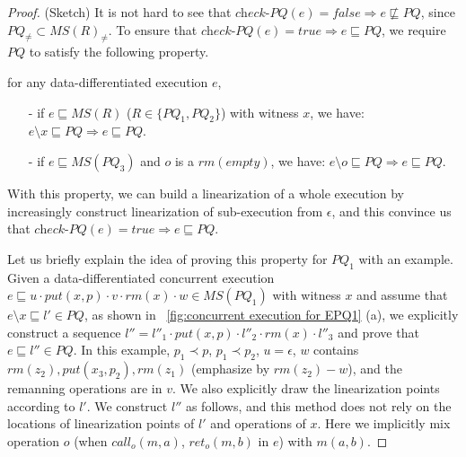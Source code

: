 \begin {proof} (Sketch)
It is not hard to see that $\textit{check-PQ}(e) = \textit{false} \Rightarrow e \not\sqsubseteq \textit{PQ}$, since $\textit{PQ}_{\neq} \subset \textit{MS}(R)_{\neq}$. To ensure that $\textit{check-PQ}(e) = \textit{true} \Rightarrow e \sqsubseteq \textit{PQ}$, we require $\textit{PQ}$ to satisfy the following property.  

for any data-differentiated execution $e$,
\begin{itemize}
\setlength{\itemsep}{0.5pt}
\item[-] if $e \sqsubseteq \textit{MS}(R)$ ($R \in \{ \textit{PQ}_1, \textit{PQ}_2 \}$) with witness $x$, we have: $e \setminus x \sqsubseteq \textit{PQ} \Rightarrow e \sqsubseteq \textit{PQ}$.

\item[-] if $e \sqsubseteq \textit{MS}(\textit{PQ}_3)$ and $o$ is a $\textit{rm}(\textit{empty})$, we have: $e \setminus o \sqsubseteq \textit{PQ} \Rightarrow e \sqsubseteq \textit{PQ}$.
\end{itemize}

With this property, we can build a linearization of a whole execution by increasingly construct linearization of sub-execution from $\epsilon$, and this convince us that $\textit{check-PQ}(e) = \textit{true} \Rightarrow e \sqsubseteq \textit{PQ}$. 

Let us briefly explain the idea of proving this property for $\textit{PQ}_1$ with an example. Given a data-differentiated concurrent execution $e \sqsubseteq u \cdot \textit{put}(x,p) \cdot v \cdot \textit{rm}(x) \cdot w \in \textit{MS}(\textit{PQ}_1)$ with witness $x$ and assume that $e \setminus x \sqsubseteq l' \in \textit{PQ}$, as shown in \figurename~\ref{fig:concurrent execution for EPQ1} (a), we explicitly construct a sequence $l''= l''_1 \cdot \textit{put}(x,p) \cdot l''_2 \cdot \textit{rm}(x) \cdot l''_3$ and prove that $e \sqsubseteq l'' \in \textit{PQ}$. In this example, $p_1 \prec p$, $p_1 \prec p_2$, $u=\epsilon$, $w$ contains $\textit{rm}(z_2), \textit{put}(x_3,p_2), \textit{rm}(z_1)$ (emphasize by $\textit{rm}(z_2)-w$), and the remanning operations are in $v$. We also explicitly draw the linearization points according to $l'$. We construct $l''$ as follows, and this method does not rely on the locations of linearization points of $l'$ and operations of $x$. Here we implicitly mix operation $o$ (when $\textit{call}_o(m,a)$, $\textit{ret}_o(m,b)$ in $e$) with $m(a,b)$.


\end{proof}
